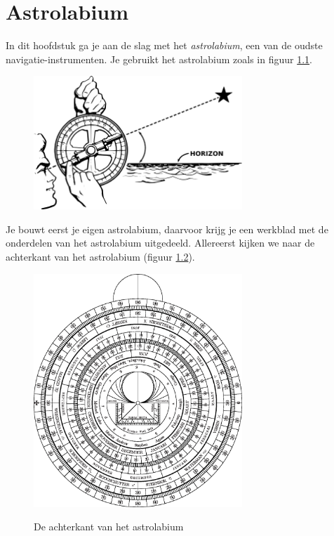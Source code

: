 \chapter{Astrolabium}

In dit hoofdstuk ga je aan de slag met het \textit{astrolabium}, een van de oudste navigatie-instrumenten. Je gebruikt het astrolabium zoals in figuur \ref{astrolabe-face}.

\begin{figure}
 \includegraphics[width=0.7\textwidth]{astrolabe-hi.png}
 \label{astrolabe-face}
\end{figure}

Je bouwt eerst je eigen astrolabium, daarvoor krijg je een werkblad met de onderdelen van het astrolabium uitgedeeld. Allereerst kijken we naar de achterkant van het astrolabium (figuur \ref{astrolabe-back}).

\begin{figure}
 \includegraphics[width=0.7\textwidth]{astrolabiumNL/mother_back.eps}
 \label{astrolabe-back}
 \caption{De achterkant van het astrolabium}
\end{figure}

